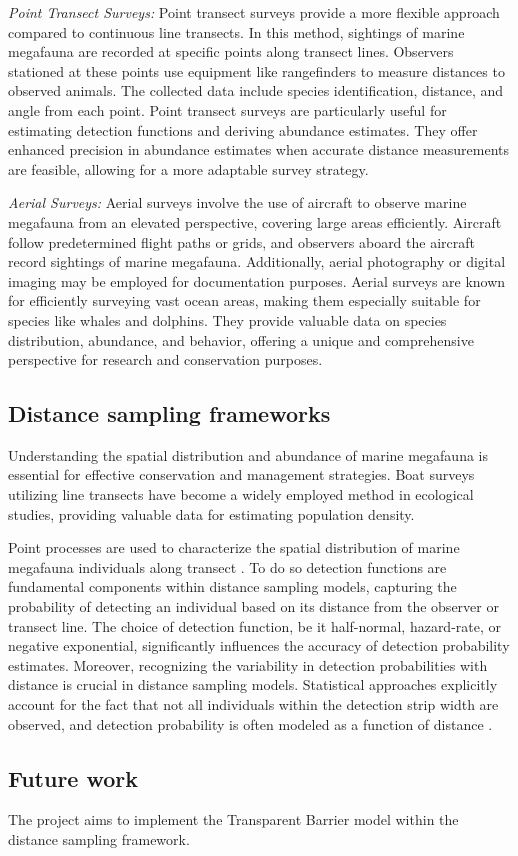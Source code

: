 \documentclass[
]{book}
\begin{document}
\emph{Point Transect Surveys:} Point transect surveys provide a more flexible approach compared to continuous line transects. In this method, sightings of marine megafauna are recorded at specific points along transect lines. Observers stationed at these points use equipment like rangefinders to measure distances to observed animals. The collected data include species identification, distance, and angle from each point. Point transect surveys are particularly useful for estimating detection functions and deriving abundance estimates. They offer enhanced precision in abundance estimates when accurate distance measurements are feasible, allowing for a more adaptable survey strategy.

\emph{Aerial Surveys:} Aerial surveys involve the use of aircraft to observe marine megafauna from an elevated perspective, covering large areas efficiently. Aircraft follow predetermined flight paths or grids, and observers aboard the aircraft record sightings of marine megafauna. Additionally, aerial photography or digital imaging may be employed for documentation purposes. Aerial surveys are known for efficiently surveying vast ocean areas, making them especially suitable for species like whales and dolphins. They provide valuable data on species distribution, abundance, and behavior, offering a unique and comprehensive perspective for research and conservation purposes.

\hypertarget{distance-sampling-frameworks}{%
\subsection{Distance sampling frameworks}\label{distance-sampling-frameworks}}

Understanding the spatial distribution and abundance of marine megafauna is essential for effective conservation and management strategies. Boat surveys utilizing line transects have become a widely employed method in ecological studies, providing valuable data for estimating population density.

Point processes are used to characterize the spatial distribution of marine megafauna individuals along transect . To do so detection functions are fundamental components within distance sampling models, capturing the probability of detecting an individual based on its distance from the observer or transect line. The choice of detection function, be it half-normal, hazard-rate, or negative exponential, significantly influences the accuracy of detection probability estimates. Moreover, recognizing the variability in detection probabilities with distance is crucial in distance sampling models. Statistical approaches explicitly account for the fact that not all individuals within the detection strip width are observed, and detection probability is often modeled as a function of distance \citep{ackerman_aerial_nodate, aguero-valverde_direct_2014, alves_aerial_2013, buckland_distance_2015}.

\hypertarget{future-work}{%
\subsection{Future work}\label{future-work}}

The project aims to implement the Transparent Barrier model within the distance sampling framework.

  
\end{document}
